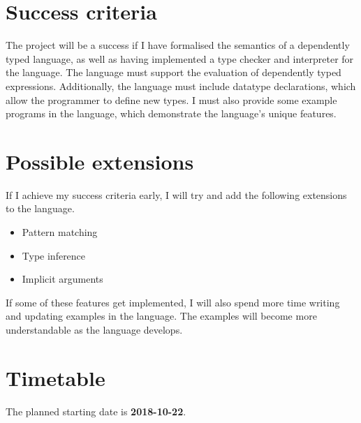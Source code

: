 \documentclass[12pt,a4paper,twoside]{article}
\begin{document}
\section*{Success criteria}

The project will be a success if I have formalised the semantics of a dependently typed language, as well as having implemented a type checker and interpreter for the language.
The language must support the evaluation of dependently typed expressions.
Additionally, the language must include datatype declarations, which allow the programmer to define new types.
I must also provide some example programs in the language, which demonstrate the language's unique features.


\section*{Possible extensions}

If I achieve my success criteria early, I will try and add the following extensions to the language.

\begin{itemize}
	\item Pattern matching
	\item Type inference
	\item Implicit arguments
\end{itemize}

If some of these features get implemented, I will also spend more time writing and updating examples in the language.
The examples will become more understandable as the language develops.


\section*{Timetable}

The planned starting date is \textbf{2018-10-22}.
\end{document}
